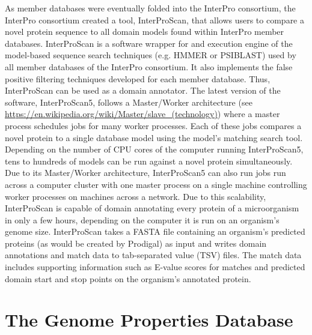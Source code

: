 As member databases were eventually folded into the InterPro consortium, the InterPro consortium created a tool, InterProScan, that allows users to compare a novel protein sequence to all domain models found within InterPro member databases. InterProScan is a software wrapper for and execution engine of the model-based sequence search techniques (e.g. HMMER or PSIBLAST) used by all member databases of the InterPro consortium. It also implements the false positive filtering techniques developed for each member database. Thus, InterProScan can be used as a domain annotator. The latest version of the software, InterProScan5, follows a Master/Worker architecture (see \href{https://en.wikipedia.org/wiki/Master/slave\_(technology)}{https://en.wikipedia.org/wiki/Master/slave\_(technology)}) where a master process schedules jobs for many worker processes. Each of these jobs compares a novel protein to a single database model using the model's matching search tool. Depending on the number of CPU cores of the computer running InterProScan5, tens to hundreds of models can be run against a novel protein simultaneously. Due to its Master/Worker architecture, InterProScan5 can also run jobs run across a computer cluster with one master process on a single machine controlling worker processes on machines across a network. Due to this scalability, InterProScan is capable of domain annotating every protein of a microorganism in only a few hours, depending on the computer it is run on an organism's genome size. InterProScan takes a FASTA file \cite{pearson19905} containing an organism's predicted proteins (as would be created by Prodigal) as input and writes domain annotations and match data to tab-separated value (TSV) files. The match data includes supporting information such as E-value scores for matches and predicted domain start and stop points on the organism's annotated protein.

\section{The Genome Properties Database}

